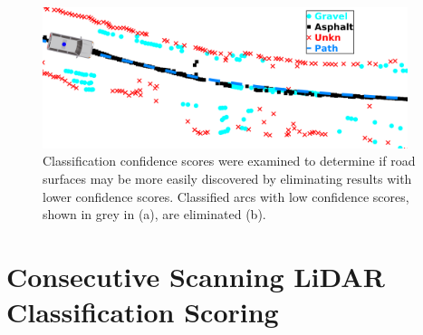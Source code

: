 \documentclass[numbered,pdftex]{ohio-etd}
\begin{document}
{{%
		
		\begin{figure}[H]
			\centering
			\includegraphics[width=0.95\textwidth]{Defense_Images/conf_elim_example}
			\caption[]{Classification confidence scores were examined to determine if road surfaces may be more easily discovered by eliminating results with lower confidence scores. Classified arcs with low confidence scores, shown in grey in (a), are eliminated (b). }
			\label{fig:conf_results}
		\end{figure}
		
	} %
	
	
	\section{Consecutive Scanning LiDAR Classification Scoring}\label{sec:consec_class_scoring}{
		
}}
\end{document}
